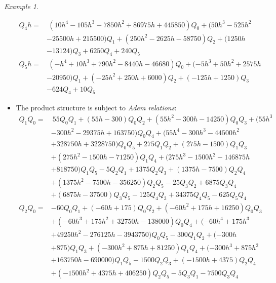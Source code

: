 \documentclass{gtpart}
\theoremstyle{definition}
\theoremstyle{remark}
\newtheorem{ex}[equation]{Example}
\renewcommand{\=}{\approx}
\renewcommand{\-}{\sim}
\numberwithin{equation}{section}
\begin{document}
\begin{ex}
\begin{itemize}
\begin{equation*}
\begin{split}
    Q_4 h = & ~ (10 h^4 - 105 h^3 - 7850 h^2 + 86975 h + 445850) Q_0 + (50 h^3 - 525 h^2 \\
            & - 25500 h + 215500) Q_1 + (250 h^2 - 2625 h - 58750) Q_2 + (1250 h \\
            & - 13124) Q_3 + 6250 Q_4 + 240 Q_5 \\
    Q_5 h = & ~ (-h^4 + 10 h^3 + 790 h^2 - 8440 h - 46680) Q_0 + (-5 h^3 + 50 h^2 + 2575 h \\
            & - 20950) Q_1 + (-25 h^2 + 250 h + 6000) Q_2 + (-125 h + 1250) Q_3 \\
            & - 624 Q_4 + 10 Q_5 
   \end{split}
  \end{equation*}

  \item The product structure is subject to {\em Adem relations}: 
  \begin{equation*}
   \begin{split}
    Q_1 Q_0 = & ~ 55 Q_0 Q_1 + (55 h - 300) Q_0 Q_2 + (55 h^2 - 300 h - 14250) Q_0 Q_3 + (55 h^3 \\
              & - 300 h^2 - 29375 h + 163750) Q_0 Q_4 + (55 h^4 - 300 h^3 - 44500 h^2 \\
              & + 328750 h + 3228750) Q_0 Q_5 + 275 Q_1 Q_2 + (275 h - 1500) Q_1 Q_3 \\
              & + (275 h^2 - 1500 h - 71250) Q_1 Q_4 + (275 h^3 - 1500 h^2 - 146875 h \\
              & + 818750) Q_1 Q_5 - 5 Q_2 Q_1 + 1375 Q_2 Q_3 + (1375 h - 7500) Q_2 Q_4 \\
              & + (1375 h^2 - 7500 h - 356250) Q_2 Q_5 - 25 Q_3 Q_2 + 6875 Q_3 Q_4 \\
              & + (6875 h - 37500) Q_3 Q_5 - 125 Q_4 Q_3 + 34375 Q_4 Q_5 - 625 Q_5 Q_4 \\
    Q_2 Q_0 = & -60 Q_0 Q_1 + (-60 h + 175) Q_0 Q_2 + (-60 h^2 + 175 h + 16250) Q_0 Q_3 \\
              & + (-60 h^3 + 175 h^2 + 32750 h - 138000) Q_0 Q_4 + (-60 h^4 + 175 h^3 \\
              & + 49250 h^2 - 276125 h - 3943750) Q_0 Q_5 - 300 Q_1 Q_2 + (-300 h \\
              & + 875) Q_1 Q_3 + (-300 h^2 + 875 h + 81250) Q_1 Q_4 + (-300 h^3 + 875 h^2 \\
              & + 163750 h - 690000) Q_1 Q_5 - 1500 Q_2 Q_3 + (-1500 h + 4375) Q_2 Q_4 \\
              & + (-1500 h^2 + 4375 h + 406250) Q_2 Q_5 - 5 Q_3 Q_1 - 7500 Q_3 Q_4 \\

\end{split}
\end{equation*}
\end{itemize}
\end{ex}
\end{document}
